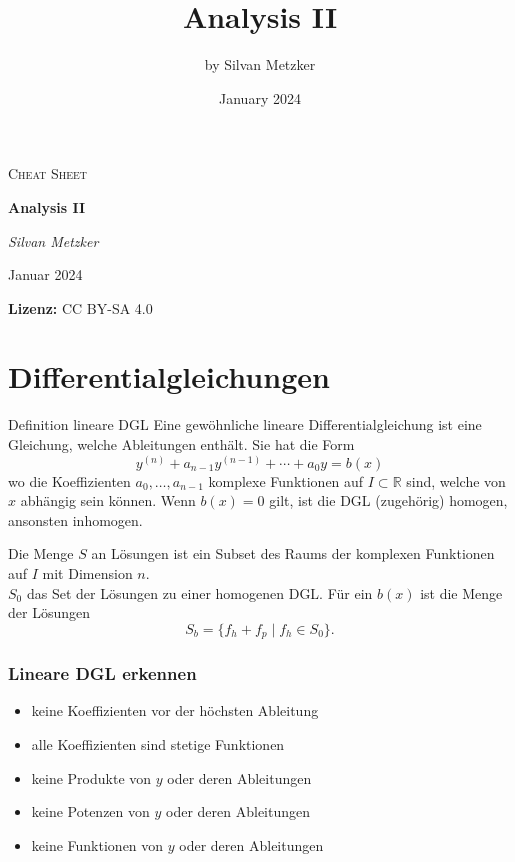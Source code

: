 \documentclass[a4paper,10pt]{article}
\title{Analysis II}
\author{by Silvan Metzker}
\date{January 2024}
\def\R{\mathbb{R}}
\begin{document}
\setlength{\abovedisplayskip}{3pt}
\setlength{\belowdisplayskip}{3pt}
\setlength{\abovedisplayshortskip}{3pt}
\setlength{\belowdisplayshortskip}{3pt}

\begin{center}
	\vspace{1cm}
	{\Large \textsc{Cheat Sheet}\par}
	{\huge\bfseries Analysis II\par}
	\vspace{0.5cm}
	{\Large\itshape Silvan Metzker\par}
	{\large Januar 2024\par}
	\vspace{0.4cm}
	{\textbf{Lizenz:} CC BY-SA 4.0}
\end{center}

\section{Differentialgleichungen}
\begin{mainbox}{Definition lineare DGL}
	Eine gewöhnliche lineare Differentialgleichung ist eine Gleichung, welche Ableitungen enthält. Sie hat die Form $$y^{(n)} + a_{n-1} y^{(n-1)} + \cdots + a_0y = b(x)$$
	wo die Koeffizienten $a_0, \ldots, a_{n-1}$ komplexe Funktionen auf $I \subset \R$ sind, welche von $x$ abhängig sein können. Wenn $b(x) = 0$ gilt, ist die DGL (zugehörig) homogen, ansonsten inhomogen. 
\end{mainbox}
Die Menge $S$ an Lösungen ist ein Subset des Raums der komplexen Funktionen auf $I$ mit Dimension $n$. \\
$S_0$ das Set der Lösungen zu einer homogenen DGL. Für ein $b(x)$ ist die Menge der Lösungen 
$$S_b = \{f_h + f_p \mid f_h \in S_0\}.$$
\subsubsection*{Lineare DGL erkennen}
\begin{itemize}
	\item keine Koeffizienten vor der höchsten Ableitung
	\item alle Koeffizienten sind stetige Funktionen
	\item keine Produkte von $y$ oder deren Ableitungen
	\item keine Potenzen von $y$ oder deren Ableitungen
	\item keine Funktionen von $y$ oder deren Ableitungen
\end{itemize}
\end{document}
